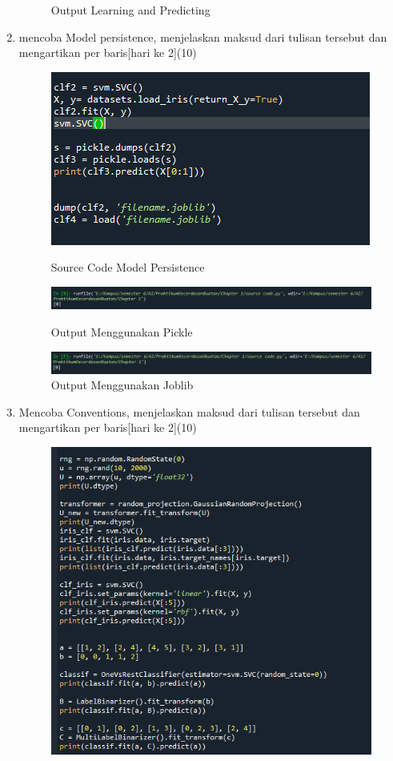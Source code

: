 \begin{enumerate}
\begin{figure}[!htbp]
	\caption{Output Learning and Predicting}
\end{figure}
\item
mencoba Model persistence, menjelaskan maksud dari tulisan tersebut dan mengartikan per baris[hari ke 2](10)
\begin{figure}[!htbp]
    \centering
   	\includegraphics[scale=0.5]{figures/chapter 1/4/1.PNG}
	\caption{Source Code Model Persistence}
	\includegraphics[scale=0.5]{figures/chapter 1/4/2.PNG}
	\caption{Output Menggunakan Pickle}
	\includegraphics[scale=0.5]{figures/chapter 1/4/3.PNG}
	\caption{Output Menggunakan Joblib}
\end{figure}
\newpage
\item 
Mencoba Conventions, menjelaskan maksud dari tulisan tersebut dan mengartikan per baris[hari ke 2](10)
	\begin{figure}[!htbp]
	    \centering
	   	\includegraphics[scale=0.5]{figures/chapter 1/5/1.PNG}

\end{figure}
\end{enumerate}
